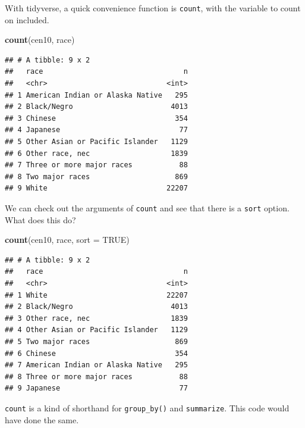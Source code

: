 \documentclass[]{book}
\newenvironment{Shaded}{\begin{snugshade}}{\end{snugshade}}
\newcommand{\KeywordTok}[1]{\textcolor[rgb]{0.13,0.29,0.53}{\textbf{#1}}}
\newcommand{\DataTypeTok}[1]{\textcolor[rgb]{0.13,0.29,0.53}{#1}}
\newcommand{\StringTok}[1]{\textcolor[rgb]{0.31,0.60,0.02}{#1}}
\newcommand{\OtherTok}[1]{\textcolor[rgb]{0.56,0.35,0.01}{#1}}
\newcommand{\OperatorTok}[1]{\textcolor[rgb]{0.81,0.36,0.00}{\textbf{#1}}}
\newcommand{\NormalTok}[1]{#1}
\theoremstyle{definition}
\theoremstyle{definition}
\theoremstyle{definition}
\theoremstyle{remark}
\begin{document}
With tidyverse, a quick convenience function is \texttt{count}, with the
variable to count on included.

\begin{Shaded}
\begin{Highlighting}[]
\KeywordTok{count}\NormalTok{(cen10, race)}
\end{Highlighting}
\end{Shaded}

\begin{verbatim}
## # A tibble: 9 x 2
##   race                                 n
##   <chr>                            <int>
## 1 American Indian or Alaska Native   295
## 2 Black/Negro                       4013
## 3 Chinese                            354
## 4 Japanese                            77
## 5 Other Asian or Pacific Islander   1129
## 6 Other race, nec                   1839
## 7 Three or more major races           88
## 8 Two major races                    869
## 9 White                            22207
\end{verbatim}

We can check out the arguments of \texttt{count} and see that there is a
\texttt{sort} option. What does this do?

\begin{Shaded}
\begin{Highlighting}[]
\KeywordTok{count}\NormalTok{(cen10, race, }\DataTypeTok{sort =} \OtherTok{TRUE}\NormalTok{)}
\end{Highlighting}
\end{Shaded}

\begin{verbatim}
## # A tibble: 9 x 2
##   race                                 n
##   <chr>                            <int>
## 1 White                            22207
## 2 Black/Negro                       4013
## 3 Other race, nec                   1839
## 4 Other Asian or Pacific Islander   1129
## 5 Two major races                    869
## 6 Chinese                            354
## 7 American Indian or Alaska Native   295
## 8 Three or more major races           88
## 9 Japanese                            77
\end{verbatim}

\texttt{count} is a kind of shorthand for \texttt{group\_by()} and
\texttt{summarize}. This code would have done the same.

\begin{Shaded}
\end{Shaded}
\end{document}
